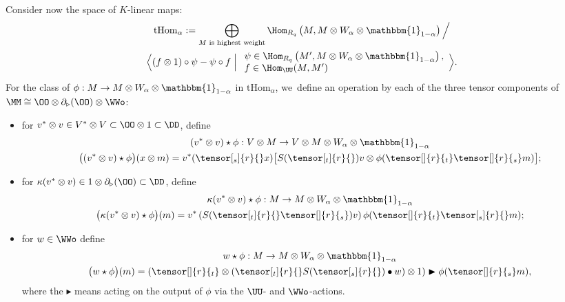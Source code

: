 Consider now the space of $K$-linear maps:
\begin{multline}
\mathrm{tHom}_\alpha:=\bigoplus_{M\text{ is highest weight}}\Hom_{R_q}\left(M, M\otimes W_{\alpha}\otimes\mathbbm{1}_{1-\alpha}\right)\Big/\\
\Bigl\langle
(f\otimes 1)\circ \psi -\psi \circ f\Bigm|
\begin{array}{l}
\psi\in\Hom_{R_q}\left(M', M\otimes W_{\alpha}\otimes\mathbbm{1}_{1-\alpha}\right),\\
f\in\Hom_\UU(M,M')
\end{array}
\Bigr\rangle.
\label{tHomLinRel}
\end{multline}
For the class of $\phi:M\to M\otimes W_{\alpha}\otimes\mathbbm{1}_{1-\alpha}$ in $\mathrm{tHom}_\alpha$, we~define an operation by each of the three tensor components of $\MM\cong\OO\otimes\partial_{\triangleright}(\OO)\otimes \WWo$:
\begin{itemize}
\item for $v^*\otimes v\in V^*\otimes V\subset\OO\otimes1\subset\DD$, define
\begin{equation}
\begin{gathered}
(v^*\otimes v)\star\phi:V\otimes M\to V\otimes M\otimes W_{\alpha}\otimes\mathbbm{1}_{1-\alpha}\\
\big((v^*\otimes v)\star\phi\big)(x\otimes m)=v^*(\tensor[_s]{r}{}x)\bigl[S(\tensor[_t]{r}{})v\otimes\phi(\tensor[]{r}{_t}\tensor[]{r}{_s}m)\bigr];
\end{gathered}
\label{tHomActA}
\end{equation}
\item for $\kappa(v^*\otimes v)\in 1\otimes\partial_{\triangleright}(\OO)\subset\DD$, define
\begin{equation}
\begin{gathered}
\kappa(v^*\otimes v)\star\phi:M\to M\otimes W_{\alpha}\otimes\mathbbm{1}_{1-\alpha}\\
\big(\kappa(v^*\otimes v)\star\phi\big)(m)=v^*\left(S(\tensor[_t]{r}{}\tensor[]{r}{_s})v\right)\phi(\tensor[]{r}{_t}\tensor[_s]{r}{}m);
\end{gathered}
\label{tHomActB}
\end{equation}
\item for $w\in \WWo$ define
\begin{equation}
\begin{gathered}
w\star\phi:M\to M\otimes W_{\alpha}\otimes\mathbbm{1}_{1-\alpha}\\
\big(w\star\phi\big)(m)=\left(\tensor[]{r}{_t}\otimes (\tensor[_t]{r}{}S(\tensor[_s]{r}{})\bullet w) \otimes 1\right)\blacktriangleright\phi(\tensor[]{r}{_s}m),
\end{gathered}
\label{tHomActW}
\end{equation}
where the $\blacktriangleright$ means acting on the output of $\phi$ via the $\UU$- and $\WWo$-actions.
\end{itemize}
